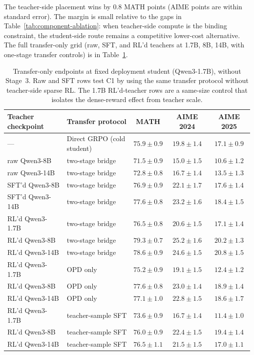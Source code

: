 \documentclass{article}
\begin{document}
The teacher-side placement wins by $0.8$ MATH points (AIME points are within standard error). The margin is small relative to the gaps in Table~\ref{tab:component-ablation}: when teacher-side compute is the binding constraint, the student-side route remains a competitive lower-cost alternative. The full transfer-only grid (raw, SFT, and RL'd teachers at 1.7B, 8B, 14B, with one-stage transfer controls) is in Table~\ref{tab:qwen-transfer-full}.

\begin{table}[!h]
\caption{Transfer-only endpoints at fixed deployment student (Qwen3-1.7B), without Stage~3. Raw and SFT rows test C1 by using the same transfer protocol without teacher-side sparse RL. The 1.7B RL'd-teacher rows are a same-size control that isolates the dense-reward effect from teacher scale.}
\label{tab:qwen-transfer-full}
\centering
\small
\begin{tabular}{llccc}
\toprule
Teacher checkpoint & Transfer protocol & MATH & AIME 2024 & AIME 2025 \\
\midrule
--- & Direct GRPO (cold student) & $75.9 \pm 0.9$ & $19.8 \pm 1.4$ & $17.1 \pm 0.9$ \\
\midrule
raw Qwen3-8B   & two-stage bridge & $71.5 \pm 0.9$ & $15.0 \pm 1.5$ & $10.6 \pm 1.2$ \\
raw Qwen3-14B  & two-stage bridge & $72.8 \pm 0.8$ & $16.7 \pm 1.4$ & $13.5 \pm 1.3$ \\
\midrule
SFT'd Qwen3-8B   & two-stage bridge & $76.9 \pm 0.9$ & $22.1 \pm 1.7$ & $17.6 \pm 1.4$ \\
SFT'd Qwen3-14B  & two-stage bridge & $77.6 \pm 0.8$ & $23.2 \pm 1.6$ & $18.4 \pm 1.5$ \\
\midrule
RL'd Qwen3-1.7B & two-stage bridge & $76.5 \pm 0.8$ & $20.6 \pm 1.5$ & $17.1 \pm 1.4$ \\
RL'd Qwen3-8B   & two-stage bridge & $\mathbf{79.3 \pm 0.7}$ & $\mathbf{25.2 \pm 1.6}$ & $20.2 \pm 1.3$ \\
RL'd Qwen3-14B  & two-stage bridge & $78.6 \pm 0.9$ & $24.6 \pm 1.5$ & $\mathbf{20.8 \pm 1.5}$ \\
\midrule
RL'd Qwen3-1.7B & OPD only           & $75.2 \pm 0.9$ & $19.1 \pm 1.5$ & $12.4 \pm 1.2$ \\
RL'd Qwen3-8B   & OPD only           & $77.6 \pm 0.8$ & $23.0 \pm 1.4$ & $18.9 \pm 1.4$ \\
RL'd Qwen3-14B  & OPD only           & $77.1 \pm 1.0$ & $22.8 \pm 1.5$ & $18.6 \pm 1.7$ \\
\midrule
RL'd Qwen3-1.7B & teacher-sample SFT & $73.6 \pm 0.9$ & $16.7 \pm 1.4$ & $11.4 \pm 1.0$ \\
RL'd Qwen3-8B   & teacher-sample SFT & $76.0 \pm 0.9$ & $22.4 \pm 1.5$ & $19.4 \pm 1.4$ \\
RL'd Qwen3-14B  & teacher-sample SFT & $76.5 \pm 1.1$ & $21.5 \pm 1.5$ & $17.0 \pm 1.1$ \\
\bottomrule
\end{tabular}
\end{table}
\end{document}
